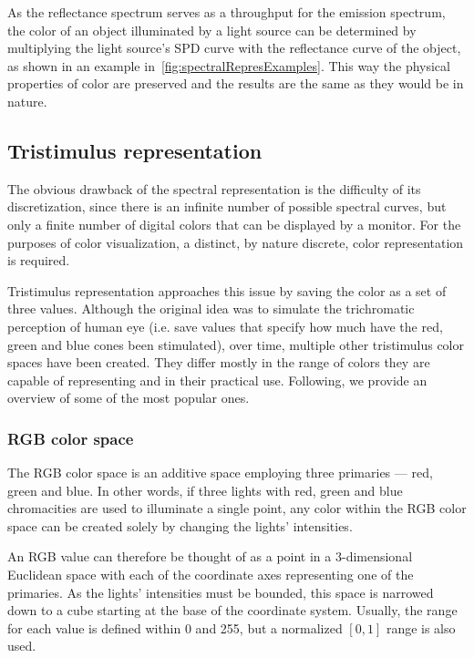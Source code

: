 As the reflectance spectrum serves as a throughput for the emission spectrum, the color of an object illuminated by a light source can be determined by multiplying the light source's SPD curve with the reflectance curve of the object, as shown in an example in~\cref{fig:spectralRepresExamples}. This way the physical properties of color are preserved and the results are the same as they would be in nature.

\subsection{Tristimulus representation} \label{ssec:tristimulusRepres}

The obvious drawback of the spectral representation is the difficulty of its discretization, since there is an infinite number of possible spectral curves, but only a finite number of digital colors that can be displayed by a monitor. For the purposes of color visualization, a distinct, by nature discrete, color
representation is required. 

Tristimulus representation approaches this issue by saving the color as a set of three values. Although the original idea was to simulate the trichromatic perception of human eye (i.e. save values that specify how much have the red, green and blue cones been stimulated), over time, multiple other tristimulus color spaces have been created. They differ mostly in the range of colors they are capable of representing and in their practical use. Following, we provide an overview of some of the most popular ones.

\subsubsection{RGB color space}
The RGB color space is an additive space employing three primaries --- red, green and blue. In other words, if three lights with red, green and blue chromacities are used to illuminate a single point, any color within the RGB color space can be created solely by changing the lights' intensities. 

An RGB value can therefore be thought of as a point in a 3-dimensional Euclidean space with each of the coordinate axes representing one of the primaries. As the lights' intensities must be bounded, this space is narrowed down to a cube starting at the base of the coordinate system. Usually, the range for each value is defined within 0 and 255, but a normalized $[0,1]$ range is also used.


